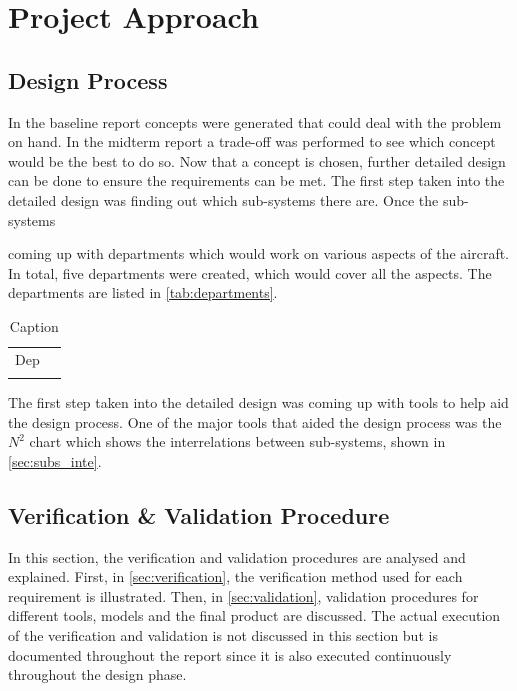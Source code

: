 \chapter{Project Approach}
\setlength{\parindent}{15pt}
\label{ch:proj_appr}

\section{Design Process}
\label{sec:desi_proc}

In the baseline report \cite{baseline} concepts were generated that could deal with the problem on hand. In the midterm report \cite{midterm} a trade-off was performed to see which concept would be the best to do so. Now that a concept is chosen, further detailed design can be done to ensure the requirements can be met. The first step taken into the detailed design was finding out which sub-systems there are. Once the sub-systems


coming up with departments which would work on various aspects of the aircraft. In total, five departments were created, which would cover all the aspects. The departments are listed in \autoref{tab:departments}.

\begin{table}[]
    \centering
    \begin{tabular}{c|c}
    Dep     &  \\
         & 
    \end{tabular}
    \caption{Caption}
    \label{tab:my_label}
\end{table}

The first step taken into the detailed design was coming up with tools to help aid the design process. One of the major tools that aided the design process was the $N^2$ chart which shows the interrelations between sub-systems, shown in \autoref{sec:subs_inte}.

\section{Verification \& Validation Procedure}
\label{sec:veri_vali_proc}

In this section, the verification and validation procedures are analysed and explained. First, in \autoref{sec:verification}, the verification method used for each requirement is illustrated. Then, in \autoref{sec:validation}, validation procedures for different tools, models and the final product are discussed. The actual execution of the verification and validation is not discussed in this section but is documented throughout the report since it is also executed continuously throughout the design phase.

